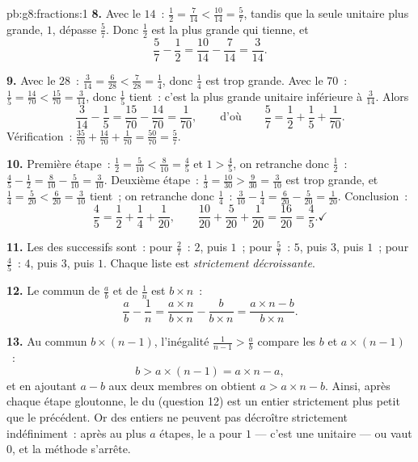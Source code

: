 \begin{solution}{pb:g8:fractions:1}
\textbf{8.} Avec le  $14$~: $\frac12 = \frac{7}{14} <
\frac{10}{14} = \frac57$, tandis que la seule  unitaire plus
grande, $1$, dépasse $\frac57$. Donc $\frac12$ est la plus grande
qui tienne, et
\[
\frac57 - \frac12 = \frac{10}{14} - \frac{7}{14} = \frac{3}{14} .
\]

\textbf{9.} Avec le  $28$~: $\frac{3}{14} = \frac{6}{28}
< \frac{7}{28} = \frac14$, donc $\frac14$ est trop grande. Avec le
 $70$~: $\frac15 = \frac{14}{70} < \frac{15}{70} =
\frac{3}{14}$, donc $\frac15$ tient~: c'est la plus grande 
unitaire inférieure à $\frac{3}{14}$. Alors
\[
\frac{3}{14} - \frac15 = \frac{15}{70} - \frac{14}{70}
= \frac{1}{70},
\qquad\text{d'où}\qquad
\frac57 = \frac12 + \frac15 + \frac{1}{70} .
\]
Vérification~: $\frac{35}{70} + \frac{14}{70} + \frac{1}{70} =
\frac{50}{70} = \frac57$.

\textbf{10.} Première étape~: $\frac12 = \frac{5}{10} <
\frac{8}{10} = \frac45$ et $1 > \frac45$, on retranche donc
$\frac12$~:
$\frac45 - \frac12 = \frac{8}{10} - \frac{5}{10} = \frac{3}{10}$.
Deuxième étape~: $\frac13 = \frac{10}{30} > \frac{9}{30} =
\frac{3}{10}$ est trop grande, et $\frac14 = \frac{5}{20} <
\frac{6}{20} = \frac{3}{10}$ tient~; on retranche donc $\frac14$~:
$\frac{3}{10} - \frac14 = \frac{6}{20} - \frac{5}{20} =
\frac{1}{20}$. Conclusion~:
\[
\frac45 = \frac12 + \frac14 + \frac{1}{20},
\qquad
\frac{10}{20} + \frac{5}{20} + \frac{1}{20} = \frac{16}{20}
= \frac45 . \checkmark
\]

\textbf{11.} Les  des  successifs sont~: pour
$\frac27$~: $2$, puis $1$~; pour $\frac57$~: $5$, puis $3$, puis
$1$~; pour $\frac45$~: $4$, puis $3$, puis $1$. Chaque liste est
\emph{strictement décroissante}.

\textbf{12.} Le  commun de $\frac ab$ et de $\frac1n$
est $b \times n$~:
\[
\frac{a}{b} - \frac{1}{n}
= \frac{a \times n}{b \times n} - \frac{b}{b \times n}
= \frac{a \times n - b}{b \times n} .
\]

\textbf{13.} Au  commun $b \times (n-1)$, l'inégalité
$\frac{1}{n-1} > \frac ab$ compare les  $b$ et
$a \times (n - 1)$~:
\[
b > a \times (n - 1) = a \times n - a ,
\]
et en ajoutant $a - b$ aux deux membres on obtient
$a > a \times n - b$. Ainsi, après chaque étape gloutonne, le
 du  (question 12) est un entier strictement plus
petit que le précédent. Or des entiers ne peuvent pas décroître
strictement indéfiniment~: après au plus $a$ étapes, le  a pour
 $1$ --- c'est une  unitaire --- ou vaut $0$, et
la méthode s'arrête.


\end{solution}
